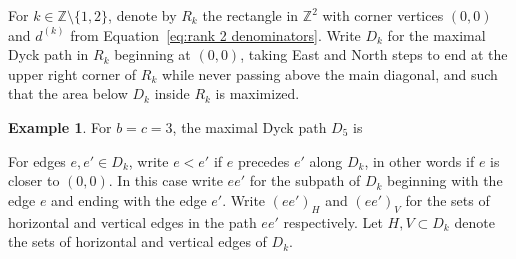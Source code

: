 \documentclass{amsart}
\theoremstyle{definition}
\newtheorem{example}[theorem]{Example}
\theoremstyle{remark}
\numberwithin{equation}{section}
\newcommand{\ZZ}{{\mathbb{Z}}}
\begin{document}
  For $k\in\ZZ\setminus\{1,2\}$, denote by $R_k$ the rectangle in $\ZZ^2$ with corner vertices $(0,0)$ and $d^{(k)}$ from Equation~\ref{eq:rank 2 denominators}.  Write $D_k$ for the maximal Dyck path in $R_k$ beginning at $(0,0)$, taking East and North steps to end at the upper right corner of $R_k$ while never passing above the main diagonal, and such that the area below $D_k$ inside $R_k$ is maximized.
  \begin{example}
    For $b=c=3$, the maximal Dyck path $D_5$ is
    \begin{center}
    \end{center}
  \end{example}
  For edges $e,e'\in D_k$, write $e<e'$ if $e$ precedes $e'$ along $D_k$, in other words if $e$ is closer to $(0,0)$.  In this case write $ee'$ for the subpath of $D_k$ beginning with the edge $e$ and ending with the edge $e'$.  Write $(ee')_H$ and $(ee')_V$ for the sets of horizontal and vertical edges in the path $ee'$ respectively.  Let $H,V\subset D_k$ denote the sets of horizontal and vertical edges of $D_k$.
\end{document}

